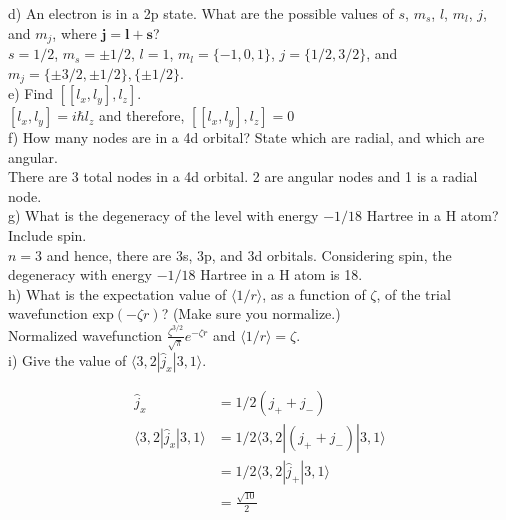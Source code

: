 \documentclass{article}
\begin{document}
\noindent d) An electron is in a 2p state. What are the possible values of $s$, $m_s$, $l$,
$m_l$, $j$, and $m_j$, where $\mathbf{j} = \mathbf{l} + \mathbf{s}$?
\\

{\color{blue} $s=1/2$, $m_s=\pm 1/2$, $l=1$, $m_l=\{-1,0,1\}$, $j=\{1/2,3/2\}$, and
  $m_j = \{\pm3/2,\pm1/2\},\{\pm1/2\}$.
}
\\

\noindent e) Find $[[l_x,l_y],l_z]$.
\\

{\color{blue}
  $[l_x,l_y] = i\hbar l_z$ and therefore, $[[l_x,l_y],l_z] = 0$
}
\\

\noindent f) How many nodes are in a 4d orbital? State which are radial, and which are
angular.
\\

{\color{blue} There are 3 total nodes in a 4d orbital. 2 are angular nodes and 1 is a
  radial node.
}
\\

\noindent g) What is the degeneracy of the level with energy $-1/18$ Hartree in a H
atom? Include spin.
\\

{\color{blue} $n=3$ and hence, there are 3s, 3p, and 3d orbitals. Considering spin,
  the degeneracy with energy $-1/18$ Hartree in a H atom is
  18.}
\\

\noindent h) What is the expectation value of $\langle 1/r \rangle$, as a function of
$\zeta$, of the trial wavefunction exp$(-\zeta r)$? (Make sure you normalize.)
\\

{\color{blue} Normalized wavefunction $\frac{\zeta^{3/2}}{\sqrt{\pi}}e^{-\zeta r}$
  and $\langle 1/r \rangle = \zeta$.
}
\\

\noindent i) Give the value of $\langle 3,2|\hat{j}_x|3,1\rangle$.

{\color{blue} 
  \begin{align*}
    \hat{j}_x & = 1/2(j_+ + j_-) \\
    \langle 3,2|\hat{j}_x|3,1\rangle & = 1/2\langle 3,2|(j_++j_-)|3,1\rangle \\
    & = 1/2\langle 3,2|\hat{j}_+|3,1\rangle \\
    & = \frac{\sqrt{10}}{2}
  \end{align*}
}
\\
\end{document}
